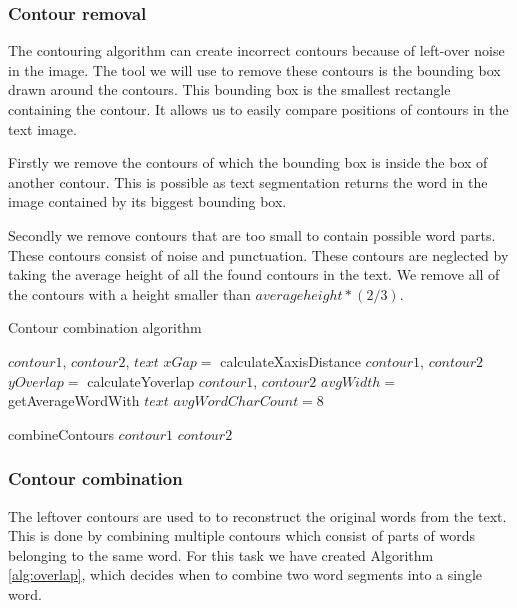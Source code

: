 \documentclass{article}
\begin{document}
\subsubsection{Contour removal}
The contouring algorithm can create incorrect contours because of left-over noise in the image.
The tool we will use to remove these contours is the bounding box drawn around the contours.
This bounding box is the smallest rectangle containing the contour. It allows us to easily compare positions of contours in the text image.

Firstly we remove the contours of which the bounding box is inside the box of another contour.
This is possible as text segmentation returns the word in the image contained by its biggest bounding box. 

Secondly we remove contours that are too small to contain possible word parts. These contours consist of noise and punctuation.
These contours are neglected by taking the average height of all the found contours in the text.
We remove all of the contours with a height smaller than $average height * (2/3)$.



\begin{algorithm}[tb]
    \caption{Contour combination algorithm}
    \label{alg:overlap}
\begin{algorithmic}
      $contour1$, $contour2$, $text$
    \STATE $xGap =$ calculateXaxisDistance $contour1$, $contour2$
    \STATE $yOverlap =$ calculateYoverlap $contour1$, $contour2$
    \STATE $avgWidth =$ getAverageWordWith $text$
    \STATE $avgWordCharCount = 8$
    
    \STATE combineContours $contour1$ $contour2$
    \ENDIF
\end{algorithmic}
\end{algorithm}



\subsubsection{Contour combination}
The leftover contours are used to to reconstruct the original words from the text.
This is done by combining multiple contours which consist of parts of words belonging to the same word. 
For this task we have created Algorithm \ref{alg:overlap}, which decides when to combine two word segments into a single word. 
\end{document}

